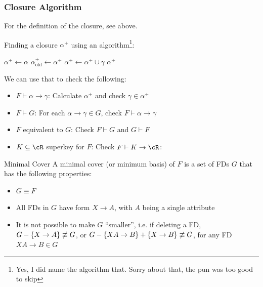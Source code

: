 \newpage
\subsubsection{Closure Algorithm}
For the definition of the closure, see above.

Finding a closure $\alpha^+$ using an algorithm\footnote{Yes, I did name the algorithm that. Sorry about that, the pun was too good to skip}:

\begin{algorithm}
    \caption{Finding Closure}
    \begin{algorithmic}[1]
            \State $\alpha^+ \gets \alpha$
            \Repeat
                \State $\alpha^+_\text{old} \gets \alpha^+$
                    \If{$\beta \subseteq \alpha^+$}
                        \State $\alpha^+ \gets \alpha^+ \cup \gamma$
                    \EndIf
                \EndFor
            \State \Return $\alpha^+$
        \EndProcedure
    \end{algorithmic}
\end{algorithm}

We can use that to check the following:
\begin{itemize}
    \item $F \vdash \alpha \rightarrow \gamma$: Calculate $\alpha^+$ and check $\gamma \in \alpha^+$
    \item $F \vdash G$: For each $\alpha \rightarrow \gamma \in G$, check $F \vdash \alpha \rightarrow \gamma$
    \item $F$ equivalent to $G$: Check $F \vdash G$ and $G \vdash F$
    \item $K \subseteq \cR$ \gls{superkey} for $F$: Check $F \vdash K \rightarrow \cR$:
\end{itemize}


\begin{definition}[]{Minimal Cover}
    A minimal cover (or minimum basis) of $F$ is a set of FDs $G$ that has the following properties:
    \begin{itemize}
        \item $G \equiv F$
        \item All FDs in $G$ have form $X \rightarrow A$, with $A$ being a single attribute
        \item It is not possible to make $G$ ``smaller'', i.e. if deleting a FD, $G - \{ X \rightarrow A \} \centernot{\equiv} G$,
              or $G - \{ XA \rightarrow B \} + \{ X \rightarrow B \} \centernot{\equiv} G$, for any FD $XA \rightarrow B \in G$
    \end{itemize}
\end{definition}

